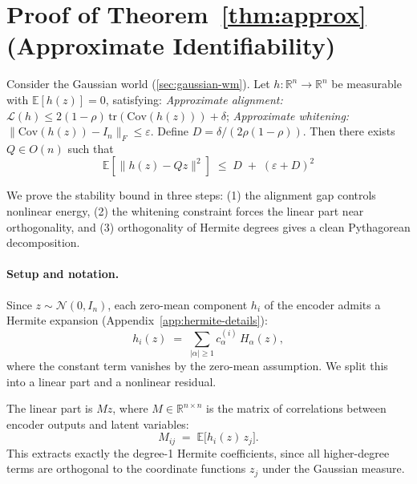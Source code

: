 \section{Proof of Theorem~\ref{thm:approx} (Approximate Identifiability)}\label{app:stability}

\begin{theoremrestate}
Consider the Gaussian world (\ref{sec:gaussian-wm}). Let $h: \mathbb{R}^n \to \mathbb{R}^n$ be measurable with $\mathbb{E}[h(z)] = 0$, satisfying:
\textit{Approximate alignment:} $\mathcal{L}(h) \leq 2(1-\rho)\,\mathrm{tr}(\mathrm{Cov}(h(z))) + \delta$;
\textit{Approximate whitening:} $\|\mathrm{Cov}(h(z)) - I_n\|_F \leq \varepsilon$.
Define $D = \delta/(2\rho(1-\rho))$. Then there exists $Q \in O(n)$ such that
\begin{equation}\label{eq:stability}
    \mathbb{E}\!\left[\|h(z) - Qz\|^2\right] \;\leq\; D \;+\; (\varepsilon + D)^2
\end{equation}
\end{theoremrestate}

We prove the stability bound in three steps: (1) the alignment gap controls
nonlinear energy, (2) the whitening constraint forces the linear part
near orthogonality, and (3) orthogonality of Hermite degrees gives a
clean Pythagorean decomposition.

\paragraph{Setup and notation.}
Since $z \sim \mathcal{N}(0, I_n)$, each zero-mean component $h_i$ of the encoder admits a Hermite expansion (Appendix~\ref{app:hermite-details}):
\begin{equation}
    h_i(z) \;=\; \sum_{|\alpha| \geq 1} c_\alpha^{(i)}\, H_\alpha(z),
\end{equation}
where the constant term vanishes by the zero-mean assumption.
We split this into a linear part and a nonlinear residual.

The linear part is $Mz$, where $M \in \mathbb{R}^{n \times n}$ is the matrix of correlations between encoder outputs and latent variables:
\begin{equation}
    M_{ij} \;=\; \mathbb{E}\bigl[h_i(z)\, z_j\bigr].
\end{equation}
This extracts exactly the degree-1 Hermite coefficients, since all higher-degree terms are orthogonal to the coordinate functions $z_j$ under the Gaussian measure.

